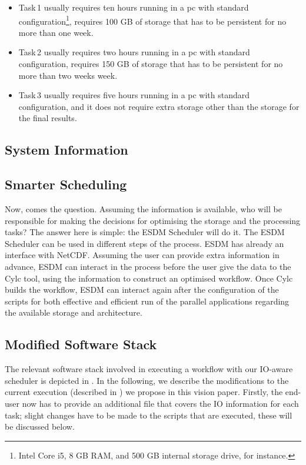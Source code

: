 \documentclass[a4paper]{article}
\begin{document}
\begin{itemize}

\item Task\,1 usually requires ten hours running in a pc with standard configuration\footnote{Intel Core i5, 8 GB RAM, and 500 GB internal storage drive, for instance.}, requires 100 GB of storage that has to be persistent for no more than one week.

\item Task\,2 usually requires two hours running in a pc with standard configuration, requires 150 GB of storage that has to be persistent for no more than two weeks week.

\item Task\,3 usually requires five hours running in a pc with standard configuration, and it does not require extra storage other than the storage for the final results.

\end{itemize}


\subsection{System Information}

\subsection{Smarter Scheduling}

Now, comes the question. Assuming the information is available, who will be responsible for making the decisions for optimising the storage and the processing tasks? The answer here is simple: the ESDM Scheduler will do it. The ESDM Scheduler can be used in different steps of the process. ESDM has already an interface with NetCDF. Assuming the user can provide extra information in advance, ESDM can interact in the process before the user give the data to the Cylc tool, using the information to construct an optimised workflow. Once Cylc builds the workflow, ESDM can interact again after the configuration of the scripts for both effective and efficient run of the parallel applications regarding the available storage and architecture.


\subsection{Modified Software Stack}

The relevant software stack involved in executing a workflow with our IO-aware scheduler is depicted in .
In the following, we describe the modifications to the current execution (described in ) we propose in this vision paper.
Firstly, the end-user now has to provide an additional file that covers the IO information for each task; slight changes have to be made to the scripts that are executed, these will be discussed below.
\end{document}
